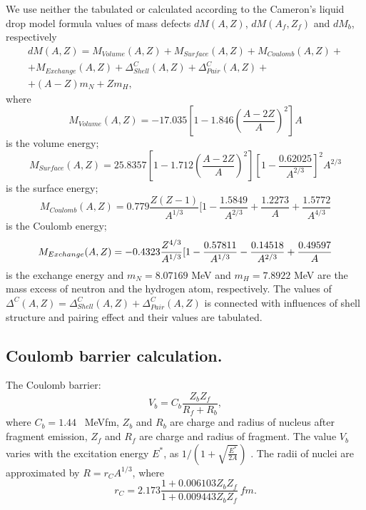 \hspace{1.0em}We use neither the tabulated \cite{AW95} or  
 calculated according to
the  Cameron's liquid drop model formula \cite{CAM57} values of
mass defects $dM(A,Z)$, $dM(A_f,Z_f)$ and $dM_b$, respectively
%
\begin{equation}
\label{SFE4} 
\begin{array}{c}
dM(A,Z)=M_{Volume}(A,Z)+M_{Surface}(A,Z)+M_{Coulomb}(A,Z)+ \\ 
+M_{Exchange}(A,Z)+\Delta^{C}_{Shell}(A,Z)+\Delta^{C}_{Pair}(A,Z)+ \\
+(A - Z)m_N + Zm_H, 
\end{array}
\end{equation}
where 
\begin{equation}
\label{SFE5}M_{Volume}(A,Z)=-17.035[1-1.846(\frac{A-2Z}A)^2]A 
\end{equation}
is the volume energy; 
\begin{equation}
\label{SFE6}M_{Surface}(A,Z)=25.8357[1-1.712(\frac{A-2Z}A)^2]
[1-\frac{0.62025}{A^{2/3}}]^2A^{2/3} 
\end{equation}
is the surface energy; 
\begin{equation}
\label{SFE7}M_{Coulomb}(A,Z)=0.779\frac{Z(Z-1)}{A^{1/3}}[1-\frac{1.5849 
}{A^{2/3}}+\frac{1.2273}A+\frac{1.5772}{A^{4/3}} 
\end{equation}
is the Coulomb energy;
%
\begin{equation}
\label{SFE8}M_{Exchange}(A,Z)=-0.4323\frac{Z^{4/3}}{A^{1/3}}[1-\frac{%
0.57811}{A^{1/3}}-\frac{0.14518}{A^{2/3}}+\frac{0.49597}A 
\end{equation}
is the exchange energy and $m_N=8.07169$ MeV and $m_H= 7.8922$ MeV are
the mass excess of neutron and the hydrogen atom, respectively. The
values of $\Delta^{C}(A,Z)=\Delta^{C}_{Shell}(A,Z)+\Delta^{C}_{Pair}(A,Z)$ 
is connected with
influences of shell structure and pairing effect and their values are
tabulated.

\subsection{Coulomb barrier calculation.} 

\hspace{1.0em}The  Coulomb barrier:
\begin{equation}
\label{SFE9}V_b = C_b\frac{Z_bZ_f}{R_f+R_b},
\end{equation}
where $C_b = 1.44$ \ MeVfm, $Z_b$ and $R_b$ are charge and
 radius of nucleus after fragment
emission, $Z_f$ and $R_f$ are charge and radius of fragment. The value
$V_b$  varies with the excitation energy $E^{*}$,
  as $1/(1+\sqrt{\frac{E^{*}}{2A}})$ \cite{Charity88}.
The radii of nuclei are
approximated by $R = r_{C}A^{1/3}$,
 where \cite{IKP94}
\begin{equation}
\label{SFE8}r_{C} = 2.173\frac{1+0.006103Z_bZ_f}{1+0.009443Z_bZ_f} \ fm. 
\end{equation}

